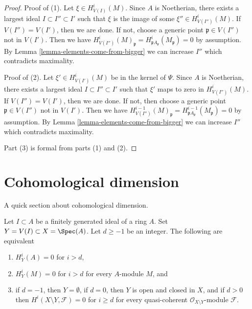 \begin{proof}
Proof of (1).
Let $\xi \in H^i_{V(I)}(M)$. Since $A$ is Noetherian, there exists a
largest ideal $I \subset I'' \subset I'$ such that $\xi$ is the image
of some $\xi'' \in H^i_{V(I'')}(M)$. If $V(I'') = V(I')$, then we are
done. If not, choose a generic point $\mathfrak p \in V(I'')$ not in $V(I')$.
Then we have $H^i_{V(I'')}(M)_\mathfrak p =
H^i_{\mathfrak pA_\mathfrak p}(M_\mathfrak p) = 0$ by assumption.
By Lemma \ref{lemma-elements-come-from-bigger} we can increase $I''$
which contradicts maximality.

\medskip\noindent
Proof of (2). Let $\xi' \in H^i_{V(I')}(M)$ be in the kernel of $\Psi$.
Since $A$ is Noetherian, there exists a
largest ideal $I \subset I'' \subset I'$ such that $\xi'$
maps to zero in $H^i_{V(I'')}(M)$. If $V(I'') = V(I')$, then we are
done. If not, then choose a generic point $\mathfrak p  \in V(I'')$
not in $V(I')$. Then we have $H^{i - 1}_{V(I'')}(M)_\mathfrak p =
H^{i - 1}_{\mathfrak pA_\mathfrak p}(M_\mathfrak p) = 0$ by assumption.
By Lemma \ref{lemma-elements-come-from-bigger} we can increase $I''$
which contradicts maximality.

\medskip\noindent
Part (3) is formal from parts (1) and (2).
\end{proof}








\section{Cohomological dimension}
\label{section-cd}

\noindent
A quick section about cohomological dimension.

\begin{lemma}
\label{lemma-cd}
Let $I \subset A$ be a finitely generated ideal of a ring $A$.
Set $Y = V(I) \subset X = \Spec(A)$. Let $d \geq -1$ be an integer.
The following are equivalent
\begin{enumerate}
\item $H^i_Y(A) = 0$ for $i > d$,
\item $H^i_Y(M) = 0$ for $i > d$ for every $A$-module $M$, and
\item if $d = -1$, then $Y = \emptyset$, if $d = 0$, then
$Y$ is open and closed in $X$, and if $d > 0$ then
$H^i(X \setminus Y, \mathcal{F}) = 0$ for $i \geq d$
for every quasi-coherent $\mathcal{O}_{X \setminus Y}$-module $\mathcal{F}$.
\end{enumerate}
\end{lemma}

